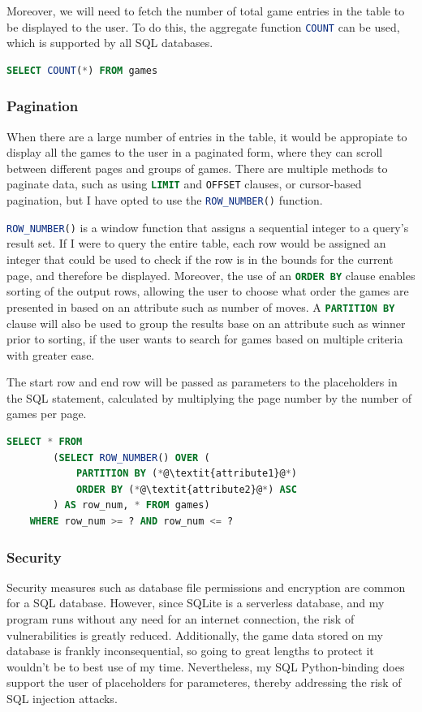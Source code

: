 \documentclass[../main/main.tex]{subfiles}
\begin{document}
Moreover, we will need to fetch the number of total game entries in the table to be displayed to the user. To do this, the aggregate function \lstinline[language=SQL]{COUNT} can be used, which is supported by all SQL databases.

\begin{lstlisting}[language=SQL, frame=single]
    SELECT COUNT(*) FROM games
\end{lstlisting}

\subsubsection*{Pagination}
When there are a large number of entries in the table, it would be appropiate to display all the games to the user in a paginated form, where they can scroll between different pages and groups of games. There are multiple methods to paginate data, such as using \lstinline[language=SQL]{LIMIT} and \lstinline[language=SQL]{OFFSET} clauses, or cursor-based pagination, but I have opted to use the \lstinline[language=SQL]{ROW_NUMBER()} function.

\lstinline[language=SQL]{ROW_NUMBER()} is a window function that assigns a sequential integer to a query's result set. If I were to query the entire table, each row would be assigned an integer that could be used to check if the row is in the bounds for the current page, and therefore be displayed. Moreover, the use of an \lstinline[language=SQL]{ORDER BY} clause enables sorting of the output rows, allowing the user to choose what order the games are presented in based on an attribute such as number of moves. A \lstinline[language=SQL]{PARTITION BY} clause will also be used to group the results base on an attribute such as winner prior to sorting, if the user wants to search for games based on multiple criteria with greater ease.

The start row and end row will be passed as parameters to the placeholders in the SQL statement, calculated by multiplying the page number by the number of games per page.

\begin{lstlisting}[language=SQL, frame=single]
    SELECT * FROM
        (SELECT ROW_NUMBER() OVER (
            PARTITION BY (*@\textit{attribute1}@*)
            ORDER BY (*@\textit{attribute2}@*) ASC
        ) AS row_num, * FROM games)
    WHERE row_num >= ? AND row_num <= ?
\end{lstlisting}

\subsubsection*{Security}
Security measures such as database file permissions and encryption are common for a SQL database. However, since SQLite is a serverless database, and my program runs without any need for an internet connection, the risk of vulnerabilities is greatly reduced. Additionally, the game data stored on my database is frankly inconsequential, so going to great lengths to protect it wouldn't be to best use of my time. Nevertheless, my SQL Python-binding does support the user of placeholders for parameteres, thereby addressing the risk of SQL injection attacks.
\end{document}
